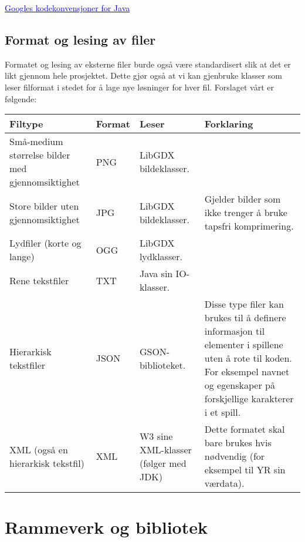 \documentclass[12pt]{report}
\begin{document}
\href{https://google.github.io/styleguide/javaguide.html}{\textcolor{blue}{Googles kodekonvensjoner for Java}}


\newpage
\subsection*{Format og lesing av filer}

Formatet og lesing av eksterne filer burde ogs{\aa} v{\ae}re standardisert slik at det er likt gjennom hele prosjektet.
Dette gj{\o}r ogs{\aa} at vi kan gjenbruke klasser som leser filformat i stedet for {\aa} lage nye l{\o}sninger for
hver fil. Forslaget v{\aa}rt er f{\o}lgende: \\

\begin{center}
\begin{tabular}{ | m{5cm} | m{1cm} | m{4cm} | m{5cm} |}
\hline
Filtype & Format & Leser & Forklaring\\
\hline

Sm{\aa}-medium st{\o}rrelse bilder med gjennomsiktighet & PNG & LibGDX bildeklasser. & ~ \\
\hline

Store bilder uten gjennomsiktighet & JPG & LibGDX bildeklasser. &
Gjelder bilder som ikke trenger {\aa} bruke tapsfri komprimering. \\
\hline

Lydfiler (korte og lange) & OGG & LibGDX lydklasser. & ~ \\
\hline

Rene tekstfiler & TXT & Java sin IO-klasser. & ~ \\
\hline

Hierarkisk tekstfiler & JSON & GSON-biblioteket. &
Disse type filer kan brukes til {\aa} definere informasjon til elementer i spillene uten {\aa} rote til koden. For
eksempel navnet og egenskaper p{\aa} forskjellige karakterer i et spill. \\
\hline

XML (ogs{\aa} en hierarkisk tekstfil) & XML & W3 sine XML-klasser (f{\o}lger med JDK) &
Dette formatet skal bare brukes hvis n{\o}dvendig (for eksempel til YR sin v{\ae}rdata).\\
\hline
\end{tabular}
\end{center}

\newpage
\section*{Rammeverk og bibliotek}
\end{document}
